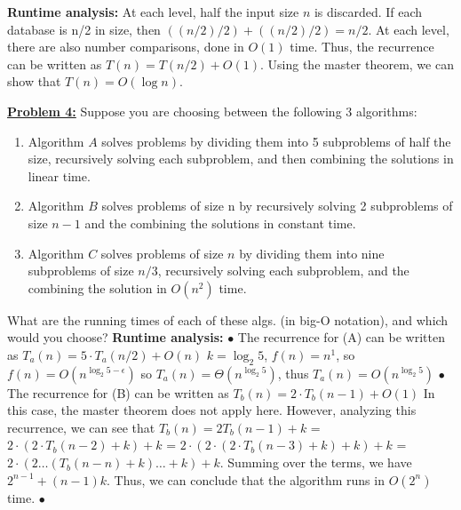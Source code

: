 \documentclass[11pt]{article}
\begin{document}
\begin{flushleft}
		\newline
		\newline
		\textbf{Runtime analysis:} At each level, half the input size $n$ is discarded. If each database is n/2 in size, then $((n/2) / 2) + ((n/2) / 2) = n/2$. At each level, there are also number comparisons, done in $O(1)$ time. Thus, the recurrence can be written as $T(n) = T(n/2) + O(1)$. Using the master theorem, we can show that $T(n) = O(\log n)$.
		\newline
		\newpage
		\item \textbf {\underline{Problem 4:}} Suppose you are choosing between the following 3 algorithms:
		\begin{enumerate}
			\item Algorithm $A$ solves problems by dividing them into 5 subproblems of half the size, recursively solving each subproblem, and then combining the solutions in linear time.
			\item Algorithm $B$ solves problems of size n by recursively solving 2 subproblems of size $n-1$ and the combining the solutions in constant time.
			\item Algorithm $C$ solves problems of size $n$ by dividing them into nine subproblems of size $n/3$, recursively solving each subproblem, and the combining the solution in $O(n^2)$ time.
		\end{enumerate}
		What are the running times of each of these algs. (in big-O notation), and which would you choose?
		\newline
		\textbf{Runtime analysis:} 
		\newline
		$\bullet$ The recurrence for (A) can be written as $T_a(n) = 5 \cdot T_a(n/2) + O(n)$
		\newline
		$k = \log_2 5$, $f(n) = n^1$, so $f(n) = O(n^{\log_2 5 - \epsilon})$ so
		$T_a(n) = \Theta(n^{\log_2 5})$, thus $T_a(n) = O(n^{\log_2 5})$
		\newline
		$\bullet$ The recurrence for (B) can be written as $T_b(n) = 2 \cdot T_b(n - 1) + O(1)$
		\newline
		In this case, the master theorem does not apply here. However, analyzing this recurrence, we can see that $T_b(n) = 2T_b(n -1) + k$ = $2\cdot(2\cdot T_b(n - 2) + k) +k$ = $2 \cdot (2 \cdot (2 \cdot T_b(n - 3) +k) +k) +k$ = \newline 
		$2 \cdot (2 \dots (T_b(n - n) +k)\dots +k) +k$. Summing over the terms, we have $2^{n - 1} + (n - 1)k$. Thus, we can conclude that the algorithm runs in $O(2^{n})$ time. \newline
		$\bullet$
	\end{flushleft}
\end{document}
